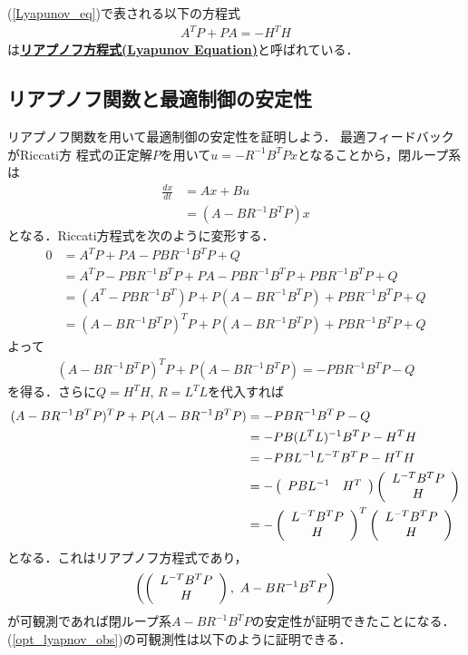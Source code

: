 (\ref{Lyapunov_eq})で表される以下の方程式
\begin{eqnarray}
	A^T P + P A = - H^T H
\label{Lyapunov_eq2}
\end{eqnarray}
は{\bf \underline{リアプノフ方程式(Lyapunov Equation)}}と呼ばれている．


\subsection{リアプノフ関数と最適制御の安定性}
リアプノフ関数を用いて最適制御の安定性を証明しよう．
最適フィードバックがRiccati方
程式の正定解$P$を用いて$u = -R^{-1} B^T P x$となることから，閉ループ系は
\begin{align}
 \frac{dx}{dt} &= Ax + B u \nonumber \\
               &= (A - B R^{-1} B^T P)x
 \label{LQ_optD}
\end{align}
となる．Riccati方程式を次のように変形する．
\begin{align}
	0 &= A^T P + P A - P B R^{-1} B^T P + Q 
\nonumber \\
	&=  A^T P - P B R^{-1} B^T P + P A - P B R^{-1} B^T P + P B R^{-1} B^T P + Q
\nonumber \\
	&= (A^T - P B R^{-1} B^T ) P + P(A-  B R^{-1} B^T P) + P B R^{-1} B^T P + Q
\nonumber \\
	&= (A - B R^{-1} B^T P )^T P + P(A-  B R^{-1} B^T P) + P B R^{-1} B^T P + Q
\end{align}
よって
\begin{align}
	(A - B R^{-1} B^T P )^T P + P(A-  B R^{-1} B^T P) = - P B R^{-1} B^T P - Q
\end{align}
を得る．さらに$Q=H^TH$, $R=L^TL$を代入すれば
\begin{align}
	(A - B R^{-1} B^T P )^T P + P(A-  B R^{-1} B^T P) &= - P B R^{-1} B^T P - Q
\nonumber \\
	&= - P B (L^T L)^{-1} B^T P - H^T H
\nonumber \\
	&= - P B L^{-1} L^{-T} B^T P - H^T H
\nonumber \\
	&= - \bmatrix{cc} P B L^{-1} & H^T \ematrix
		\bmatrix{c} L^{-T} B^T P \\ H \ematrix
\nonumber \\
	&= - \bmatrix{c} L^{-T} B^T P \\ H \ematrix^T
		\bmatrix{c} L^{-T} B^T P \\ H \ematrix
\end{align}
となる．これはリアプノフ方程式であり，
\begin{align}
	\left( \bmatrix{c} L^{-T} B^T P \\ H \ematrix, \ A - B R^{-1} B^T P \right)
\label{opt_lyapnov_obs}
\end{align}
が可観測であれば閉ループ系$A - B R^{-1} B^T P$の安定性が証明できたことになる．(\ref{opt_lyapnov_obs})の可観測性は以下のように証明できる．

